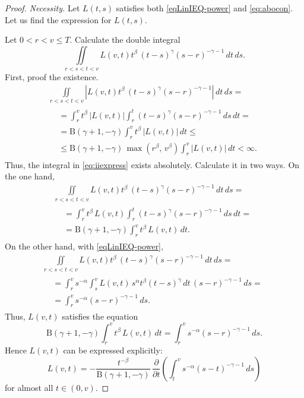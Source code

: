 \documentclass{article}
\newcommand{\vS}{v}
\theoremstyle{plain}
\theoremstyle{remark}
\theoremstyle{definition}
\begin{document}
\begin{proof}
\textit{Necessity.}
	Let $L(t,s)$ satisfies both \eqref{eqLinIEQ-power}
	and \eqref{eq:abocon}.
	Let us find the expression for $L(t,s)$.

Let $0<r<\vS\le T$.
Calculate the double integral
\begin{equation}\label{eq:iiexpress}
\iint\limits_{r<s<t<\vS} L(\vS,t)
t^\beta\, (t-s)^\gamma (s-r)^{-\gamma -1} \, dt \, ds.
\end{equation}
First, proof the existence.
\begin{multline*}
\iint\limits_{r<s<t<\vS} |L(\vS,t)
t^\beta\, (t-s)^\gamma (s-r)^{-\gamma -1}| \, dt \, ds
= \\
\begin{aligned}
&=
\int_r^\vS t^\beta \, |L(\vS,t)| \int_r^t (t-s)^\gamma (s-r)^{-\gamma -1} \, ds \, dt
= \\ &=
\mathrm{B}(\gamma{+}1, {-}\gamma)
\int_r^\vS t^\beta \, |L(\vS,t)| \, dt
\le \\ & \le
\mathrm{B}(\gamma{+}1, {-}\gamma)\,
\max(r^\beta,\, \vS^\beta)
\int_r^\vS |L(\vS,t)| \, dt < \infty .
\end{aligned}
\end{multline*}
Thus, the integral in \eqref{eq:iiexpress} exists absolutely.
Calculate it in two ways.
On the one hand,
\begin{multline*}
\iint\limits_{r<s<t<\vS} L(\vS,t)
t^\beta\, (t-s)^\gamma (s-r)^{-\gamma -1} \, dt \, ds
= \\
\begin{aligned}
&=
\int_r^\vS t^\beta \, L(\vS,t) \int_r^t (t-s)^\gamma (s-r)^{-\gamma -1} \, ds \, dt
= \\ &=
\mathrm{B}(\gamma{+}1, {-}\gamma)
\int_r^\vS t^\beta \, L(\vS,t) \, dt .
\end{aligned}
\end{multline*}
On the other hand, with \eqref{eqLinIEQ-power},
\begin{multline*}
\iint\limits_{r<s<t<\vS} L(\vS,t)
t^\beta\, (t-s)^\gamma (s-r)^{-\gamma -1} \, dt \, ds
= \\
\begin{aligned}
&=
\int_r^\vS s^{-\alpha} \int_s^\vS L(\vS,t) \, s^\alpha t^\beta (t-s)^\gamma \, dt
\, (s-r)^{-\gamma-1} \, ds
= \\ &=
\int_r^\vS s^{-\alpha} (s-r)^{-\gamma-1} \, ds.
\end{aligned}
\end{multline*}
Thus, $L(\vS,t)$ satisfies the equation
\[
\mathrm{B}(\gamma{+}1, {-}\gamma)
\int_r^\vS t^\beta \, L(\vS,t) \, dt
=
\int_r^\vS s^{-\alpha} (s-r)^{-\gamma-1} \, ds.
\]
Hence $L(\vS,t)$ can be expressed explicitly:
\begin{equation}\label{eq:Lviadif}
L(\vS,t) = - \frac{t^{-\beta}}{\mathrm{B}(\gamma{+}1, {-}\gamma)} \,
\frac{\partial}{\partial t}\!
\left( \int_t^\vS s^{-\alpha} (s-t)^{-\gamma-1} \, ds \right)
\end{equation}
for almost all $t\in(0,\vS)$.


\end{proof}
\end{document}
